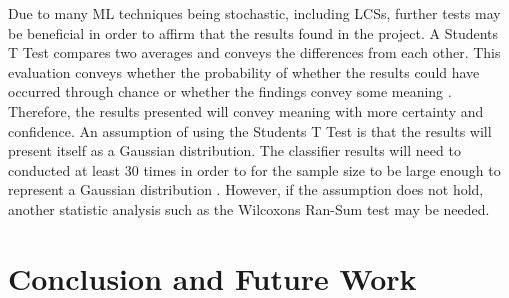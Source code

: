 Due to many ML techniques being stochastic, including LCSs, further tests may be beneficial in order to affirm that the results found in the project. A Student\textquotesingle s T Test compares two averages and conveys the differences from each other. This evaluation conveys whether the probability of whether the results could have occurred through chance or whether the findings convey some meaning \cite{blair1980comparison}. Therefore, the results presented will convey meaning with more certainty and confidence. An assumption of using the Student\textquotesingle s T Test is that the results will present itself as a Gaussian distribution. The classifier results will need to conducted at least 30 times in order to for the sample size to be large enough to represent a Gaussian distribution \cite{blair1980comparison}. However, if the assumption does not hold, another statistic analysis such as the Wilcoxon\textquotesingle s Ran-Sum test \cite{wilcoxon1950some} may be needed.


\chapter{Conclusion and Future Work}


